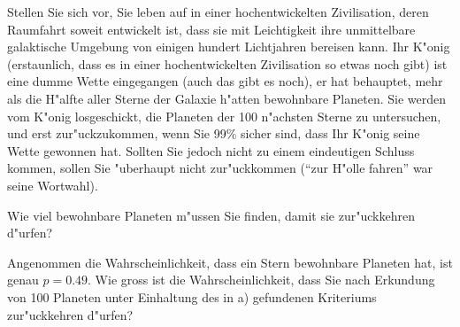 Stellen Sie sich vor, Sie leben auf in einer hochentwickelten Zivilisation,
deren Raumfahrt soweit entwickelt ist, dass sie mit Leichtigkeit ihre
unmittelbare galaktische Umgebung von einigen hundert Lichtjahren
bereisen kann. Ihr K"onig (erstaunlich, dass es in einer hochentwickelten
Zivilisation so etwas noch gibt) ist eine dumme Wette eingegangen (auch
das gibt es noch), er hat behauptet, mehr als die H"alfte aller Sterne der
Galaxie h"atten bewohnbare Planeten. Sie werden vom K"onig losgeschickt,
die Planeten der
100 n"achsten Sterne zu untersuchen, und erst zur"uckzukommen, wenn
Sie 99\% sicher sind, dass Ihr K"onig seine Wette gewonnen hat.
Sollten Sie jedoch nicht zu einem eindeutigen Schluss kommen, sollen Sie
"uberhaupt nicht zur"uckkommen (``zur H"olle fahren'' war seine Wortwahl).
\begin{teilaufgaben}
\item
Wie viel bewohnbare Planeten m"ussen Sie finden, damit sie zur"uckkehren
d"urfen?
\item
Angenommen die Wahrscheinlichkeit, dass ein Stern bewohnbare Planeten
hat, ist genau $p=0.49$.
Wie gross ist die Wahrscheinlichkeit, dass Sie nach Erkundung von 100
Planeten unter Einhaltung des in a) gefundenen Kriteriums zur"uckkehren
d"urfen?
\end{teilaufgaben}

